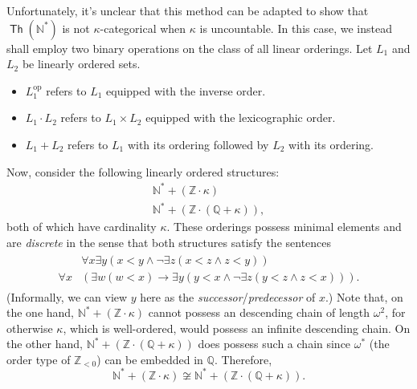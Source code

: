 \documentclass[10pt,letterpaper,cm]{nupset}
\theoremstyle{definition}
\theoremstyle{theorem}
\theoremstyle{remark}
\newcommand{\N}{\mathbb N}
\newcommand{\Q}{\mathbb Q}
\newcommand{\Z}{\mathbb Z}
\newcommand{\1}{\mathbb{1}}
\newcommand{\0}{\vec 0}
\DeclareMathOperator{\op}{op}
\DeclareMathOperator{\thh}{\mathsf{Th}}
\begin{document}
\begin{solution}
Unfortunately, it's unclear that this method can be adapted to show that $\thh(\N^{\ast})$ is not $\kappa$-categorical when $\kappa$ is uncountable. In this case, we instead shall employ two binary  operations on the class of all linear orderings.
Let $L_1$ and $L_2$ be linearly ordered sets.
\begin{itemize}
\item $L_1^{\op}$ refers to $L_1$ equipped with the inverse order.
\item $L_1 \cdot L_2$ refers to $L_1 \times L_2$ equipped with the lexicographic order.
\item ${L_1 + L_2}$ refers to $L_1$ with its ordering followed by $L_2$ with its ordering.
\end{itemize}
Now, consider the following linearly ordered structures:
\begin{gather*}
 {\N^{\ast} + \left(\Z \cdot \kappa\right)}
\\ {\N^{\ast} +  \left(\Z \cdot \left(\Q +\kappa\right)\right)},
\end{gather*} both of which have cardinality $\kappa$.
These orderings possess minimal elements and are \textit{discrete} in the sense that both structures satisfy the sentences
\begin{align}
\begin{split}
& \forall{x}\exists{y}\left(x<y \land \neg{\exists{z}\left(x<z \land z<y\right)}\right) \\
 \forall{x}&\left(\exists{w}\left(w < x\right)\rightarrow \exists{y}\left(y<x \land \neg{\exists{z}\left(y<z \land z<x\right)}\right)\right).
\end{split} \label{eqn:disc}
\end{align}
(Informally, we can view $y$ here as the \textit{successor}/\textit{predecessor} of $x$.) Note that, on the one hand, $ {\N^{\ast} + \left(\Z \cdot \kappa\right)}$ cannot possess an descending chain of length $\omega^2$, for otherwise $\kappa$, which is well-ordered, would possess an infinite descending chain. On the other hand, ${\N^{\ast} +  \left(\Z \cdot \left(\Q +\kappa\right)\right)}$ does possess such a chain since $\omega^{\ast}$ (the order type of $\Z_{<0}$) can be embedded in $\Q$. Therefore, \[
{\N^{\ast} + \left(\Z \cdot \kappa\right)} \not\cong {\N^{\ast} +  \left(\Z \cdot \left(\Q +\kappa\right)\right)}.
\]


\end{solution}
\end{document}
